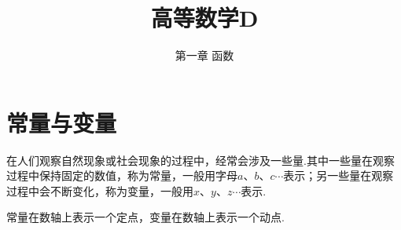 \documentclass{beamer}
\author{}
\title{高等数学D}
\subtitle{第一章 \quad 函数}
\institute{\zihao{5}  1.2 \quad 函数的概念}
\date{}
\begin{document}
	\kaishu
	\begin{frame}
		\titlepage
		
	\end{frame}
	
	\section{常量与变量}
	\begin{frame}
		在人们观察自然现象或社会现象的过程中，经常会涉及一些量.其中一些量在观察过程中保持固定的数值，称为常量，一般用字母$a$、$b$、$c\cdots$表示；另一些量在观察过程中会不断变化，称为变量，一般用$x$、$y$、$z\cdots$表示.
		
		\bigskip
		
		常量在数轴上表示一个定点，变量在数轴上表示一个动点.
	\end{frame}
	
\end{document}
